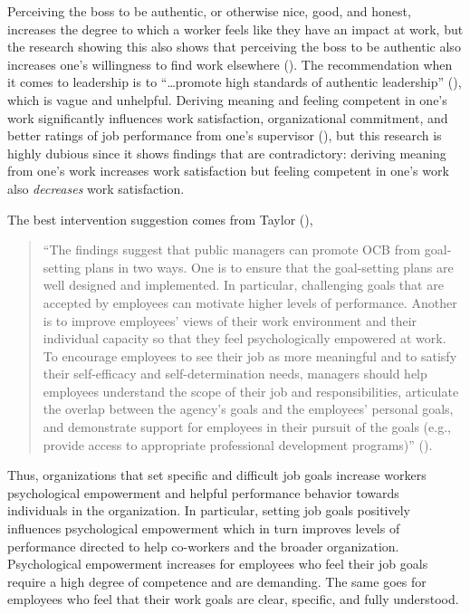 \documentclass[
  11pt,
  a4paper,
]{article}
\begin{document}
Perceiving the boss to be authentic, or otherwise nice, good, and
honest, increases the degree to which a worker feels like they have an
impact at work, but the research showing this also shows that perceiving
the boss to be authentic also increases one's willingness to find work
elsewhere (). The recommendation when it comes to leadership is to
``\ldots promote high standards of authentic leadership''
(), which is vague and unhelpful. Deriving meaning and feeling
competent in one's work significantly influences work satisfaction,
organizational commitment, and better ratings of job performance from
one's supervisor (), but this research is highly dubious since it shows findings that
are contradictory: deriving meaning from one's work increases work
satisfaction but feeling competent in one's work also \emph{decreases}
work satisfaction.

The best intervention suggestion comes from Taylor
(),

\begin{quote}
``The findings suggest that public managers can promote OCB from
goal-setting plans in two ways. One is to ensure that the goal-setting
plans are well designed and implemented. In particular, challenging
goals that are accepted by employees can motivate higher levels of
performance. Another is to improve employees' views of their work
environment and their individual capacity so that they feel
psychologically empowered at work. To encourage employees to see their
job as more meaningful and to satisfy their self-efficacy and
self-determination needs, managers should help employees understand the
scope of their job and responsibilities, articulate the overlap between
the agency's goals and the employees' personal goals, and demonstrate
support for employees in their pursuit of the goals (e.g., provide
access to appropriate professional development programs)''
().
\end{quote}

Thus, organizations that set specific and difficult job goals increase
workers psychological empowerment and helpful performance behavior
towards individuals in the organization. In particular, setting job
goals positively influences psychological empowerment which in turn
improves levels of performance directed to help co-workers and the
broader organization. Psychological empowerment increases for employees
who feel their job goals require a high degree of competence and are
demanding. The same goes for employees who feel that their work goals
are clear, specific, and fully understood.
\end{document}
